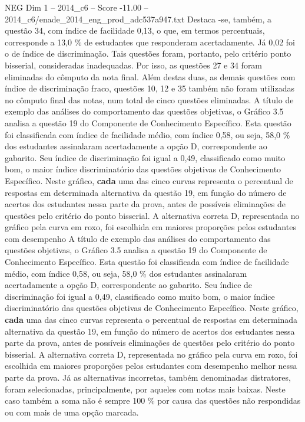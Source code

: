 \begin{textsample}{NEG Dim 1 – 2014\_c6 – Score -11.00 – 2014\_c6/enade\_2014\_eng\_prod\_adc537a947.txt}
Destaca -se, também, a questão 34, com índice de facilidade 0,13, o que, em termos percentuais, corresponde a 13,0 \% de estudantes que responderam acertadamente.
Já 0,02 foi o de índice de discriminação.
Tais questões foram, portanto, pelo critério ponto bisserial, consideradas inadequadas.
Por isso, as questões 27 e 34 foram eliminadas do cômputo da nota final.
Além destas duas, as demais questões com índice de discriminação fraco, questões 10, 12 e 35 também não foram utilizadas no cômputo final das notas, num total de cinco questões eliminadas.
A título de exemplo das análises do comportamento das questões objetivas, o Gráfico 3.5 analisa a questão 19 do Componente de Conhecimento Específico.
Esta questão foi classificada com índice de facilidade médio, com índice 0,58, ou seja, 58,0 \% dos estudantes assinalaram acertadamente a opção D, correspondente ao gabarito.
Seu índice de discriminação foi igual a 0,49, classificado como muito bom, o maior índice discriminatório das questões objetivas de Conhecimento Específico.
Neste gráfico, \textbf{cada} uma das cinco curvas representa o percentual de respostas em determinada alternativa da questão 19, em função do número de acertos dos estudantes nessa parte da prova, antes de possíveis eliminações de questões pelo critério do ponto bisserial.
A alternativa correta D, representada no gráfico pela curva em roxo, foi escolhida em maiores proporções pelos estudantes com desempenho A título de exemplo das análises do comportamento das questões objetivas, o Gráfico 3.5 analisa a questão 19 do Componente de Conhecimento Específico.
Esta questão foi classificada com índice de facilidade médio, com índice 0,58, ou seja, 58,0 \% dos estudantes assinalaram acertadamente a opção D, correspondente ao gabarito.
Seu índice de discriminação foi igual a 0,49, classificado como muito bom, o maior índice discriminatório das questões objetivas de Conhecimento Específico.
Neste gráfico, \textbf{cada} uma das cinco curvas representa o percentual de respostas em determinada alternativa da questão 19, em função do número de acertos dos estudantes nessa parte da prova, antes de possíveis eliminações de questões pelo critério do ponto bisserial.
A alternativa correta D, representada no gráfico pela curva em roxo, foi escolhida em maiores proporções pelos estudantes com desempenho melhor nessa parte da prova.
Já as alternativas incorretas, também denominadas distratores, foram selecionadas, principalmente, por aqueles com notas mais baixas.
Neste caso também a soma não é sempre 100 \% por causa das questões não respondidas ou com mais de uma opção marcada.

\end{textsample}
